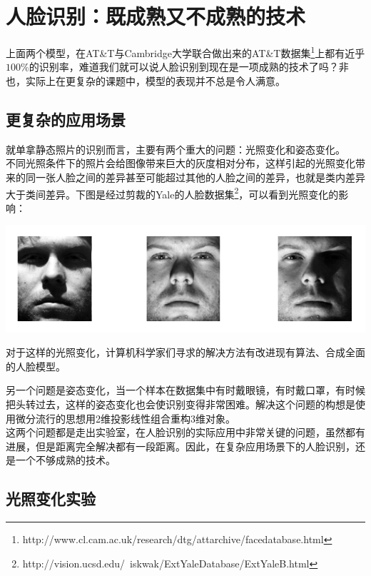 \documentclass[12pt]{article}
\begin{document}

\section{人脸识别：既成熟又不成熟的技术}

上面两个模型，在AT\&T与Cambridge大学联合做出来的AT\&T数据集\footnote{http://www.cl.cam.ac.uk/research/dtg/attarchive/facedatabase.html}上都有近乎$100\%$的识别率，难道我们就可以说人脸识别到现在是一项成熟的技术了吗？非也，实际上在更复杂的课题中，模型的表现并不总是令人满意。

\subsection{更复杂的应用场景}

就单拿静态照片的识别而言，主要有两个重大的问题：光照变化和姿态变化。\\

不同光照条件下的照片会给图像带来巨大的灰度相对分布，这样引起的光照变化带来的同一张人脸之间的差异甚至可能超过其他的人脸之间的差异，也就是类内差异大于类间差异。下图是经过剪裁的Yale的人脸数据集\footnote{http://vision.ucsd.edu/~iskwak/ExtYaleDatabase/ExtYaleB.html}，可以看到光照变化的影响：

\begin{center}
\includegraphics[width=0.8\linewidth]{./fig25.png}\\
\end{center}

对于这样的光照变化，计算机科学家们寻求的解决方法有改进现有算法、合成全面的人脸模型。

另一个问题是姿态变化，当一个样本在数据集中有时戴眼镜，有时戴口罩，有时候把头转过去，这样的姿态变化也会使识别变得非常困难。解决这个问题的构想是使用微分流行的思想用2维投影线性组合重构3维对象。\\

这两个问题都是走出实验室，在人脸识别的实际应用中非常关键的问题，虽然都有进展，但是距离完全解决都有一段距离。因此，在复杂应用场景下的人脸识别，还是一个不够成熟的技术。

\subsection{光照变化实验}
\end{document}
